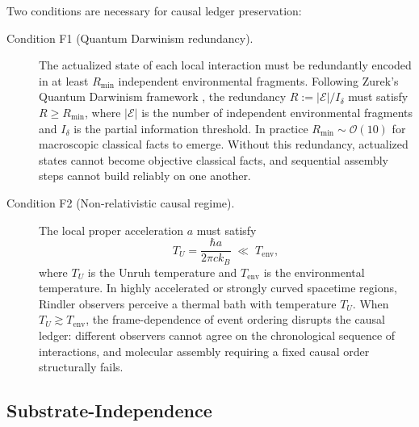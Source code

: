 \documentclass[11pt,a4paper]{article}
\theoremstyle{plain}
\theoremstyle{definition}
\theoremstyle{remark}
\begin{document}
Two conditions are necessary for causal ledger preservation:

\begin{description}
  \item[Condition F1 (Quantum Darwinism redundancy).]
  The actualized state of each local interaction must be redundantly encoded
  in at least $R_{\min}$ independent environmental fragments. Following
  Zurek's Quantum Darwinism framework \citep{Zurek2009}, the redundancy
  $R := |\mathcal{E}|/I_\delta$ must satisfy $R \geq R_{\min}$, where
  $|\mathcal{E}|$ is the number of independent environmental fragments and
  $I_\delta$ is the partial information threshold. In practice
  $R_{\min} \sim \mathcal{O}(10)$ for macroscopic classical facts to emerge.
  Without this redundancy, actualized states cannot become objective classical
  facts, and sequential assembly steps cannot build reliably on one another.

  \item[Condition F2 (Non-relativistic causal regime).]
  The local proper acceleration $a$ must satisfy
  \begin{equation}
    T_U = \frac{\hbar a}{2\pi c k_B} \;\ll\; T_{\mathrm{env}},
    \label{eq:unruh}
  \end{equation}
  where $T_U$ is the Unruh temperature \citep{Unruh1976} and $T_{\mathrm{env}}$
  is the environmental temperature. In highly accelerated or strongly curved
  spacetime regions, Rindler observers perceive a thermal bath with temperature
  $T_U$. When $T_U \gtrsim T_{\mathrm{env}}$, the frame-dependence of event
  ordering disrupts the causal ledger: different observers cannot agree on the
  chronological sequence of interactions, and molecular assembly requiring a
  fixed causal order structurally fails.
\end{description}

\subsection{Substrate-Independence}
\end{document}

